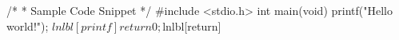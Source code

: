 \begin{listing}
\begin{linelabel}[ln:base1]
\begin{VerbatimL}[commandchars=\$\[\]]
/*
 * Sample Code Snippet
 */
#include <stdio.h>
int main(void)
{
	printf("Hello world!\n");	$lnlbl[printf]
	return 0;			$lnlbl[return]
}
\end{VerbatimL}
\end{linelabel}
\caption{Sample Code Snippet}
\label{lst:app:styleguide:Sample Code Snippet}
\end{listing}
